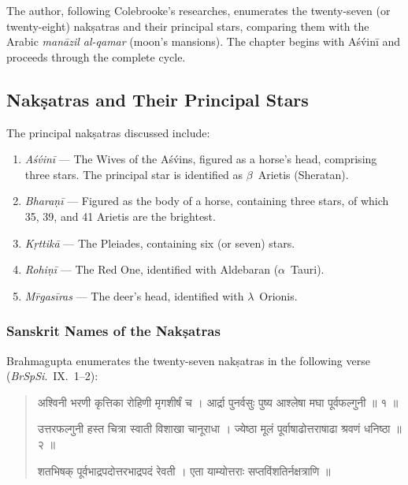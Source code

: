 \documentclass[11pt,a4paper]{article}
\newcommand{\dev}[1]{{\devanagarifont #1}}
\newenvironment{sanskritverse}{%
  \begin{quote}
  \devanagarifont
  \small
  \color{titlecolor}
}{\end{quote}}
\theoremstyle{definition}
\begin{document}
The author, following Colebrooke's researches, enumerates the twenty-seven (or twenty-eight) nak\d{s}atras and their principal stars, comparing them with the Arabic \textit{man\=azil al-qamar} (moon's mansions). The chapter begins with A\'s\'vin\=i and proceeds through the complete cycle.

\subsection{Nak\d{s}atras and Their Principal Stars}

The principal nak\d{s}atras discussed include:

\begin{enumerate}
  \item \textit{A\'s\'vin\=i} --- The Wives of the A\'s\'vins, figured as a horse's head, comprising three stars. The principal star is identified as $\beta$~Arietis (Sheratan).
  
  \item \textit{Bhara\d{n}\=i} --- Figured as the body of a horse, containing three stars, of which 35, 39, and 41 Arietis are the brightest.
  
  \item \textit{K\d{r}ttik\=a} --- The Pleiades, containing six (or seven) stars.
  
  \item \textit{Rohi\d{n}\=i} --- The Red One, identified with Aldebaran ($\alpha$~Tauri).
  
  \item \textit{M\=rgas\=iras} --- The deer's head, identified with $\lambda$~Orionis.
\end{enumerate}


\subsubsection{Sanskrit Names of the Nak\d{s}atras}

Brahmagupta enumerates the twenty-seven nak\d{s}atras in the following verse (\textit{BrSpSi}.\ IX.\ 1--2):

\begin{sanskritverse}
\dev{अश्विनी भरणी कृत्तिका रोहिणी मृगशीर्षं च ।}
\dev{आर्द्रा पुनर्वसुः पुष्य आश्लेषा मघा पूर्वफल्गुनी ॥ १ ॥}

\dev{उत्तरफल्गुनी हस्त चित्रा स्वाती विशाखा चानूराधा ।}
\dev{ज्येष्ठा मूलं पूर्वाषाढोत्तराषाढा श्रवणं धनिष्ठा ॥ २ ॥}

\dev{शतभिषक् पूर्वभाद्रपदोत्तरभाद्रपदं रेवती ।}
\dev{एता याम्योत्तराः सप्तविंशतिर्नक्षत्राणि ॥}
\end{sanskritverse}
\end{document}
